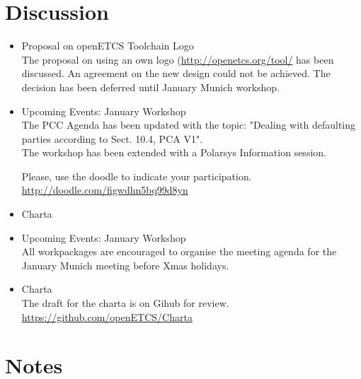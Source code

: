 \documentclass[a4paper, 11pt]{article}
\begin{document}
\section{Discussion}
\begin{itemize}

\item Proposal on openETCS Toolchain Logo\\
The proposal on using an own logo (\url{http://openetcs.org/tool/} has been discussed.
An agreement on the new design could not be achieved. The decision has been deferred until January Munich workshop.

\item Upcoming Events: January Workshop\\
The PCC Agenda has been updated with the topic: "Dealing with defaulting parties according to Sect. 10.4, PCA V1".\\

The workshop has been extended with a Polarsys Information session. 

Please, use the doodle to indicate your participation. \url{http://doodle.com/figwdhn5bq99d8yn}

\item Charta

\item Upcoming Events: January Workshop\\
All workpackages are encouraged to organise the meeting agenda for the January Munich meeting before Xmas holidays.

\item Charta\\
The draft for the charta is on Gihub for review.
\url{https://github.com/openETCS/Charta}

\end{itemize}

\section{Notes}
\end{document}

